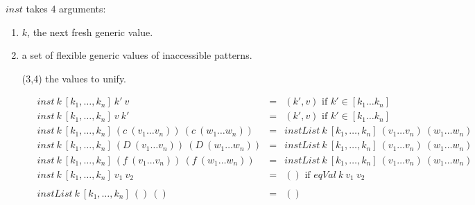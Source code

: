 \documentclass[acmsmall]{acmart}
\begin{document}
$inst$ takes 4 arguments:

\begin{enumerate}
  \item $k$, the next fresh generic value.
  \item a set of flexible generic values of inaccessible patterns.
  \item [(3,4)] the values to unify.
\end{enumerate}

\begin{figure}[H]
  \begin{equation*}
    \begin{aligned}
      inst \: k \: [k_1,\dots,k_n] \: k' \: v                                            & =              & (k', v) \textrm{ if } k' \in [k_1 \dots k_n]                                                                                                                      \\
      inst \: k \: [k_1,\dots,k_n] \: v \: k'                                            & =              & (k', v) \textrm{ if } k' \in [k_1 \dots k_n]                                                                                                                      \\
      inst \: k \: [k_1,\dots,k_n] \: (c \: (v_1 \dots v_n)) \: (c \: (w_1 \dots w_n))   & =              & instList \: k \: [k_1,\dots,k_n] \: (v_1 \dots v_n) \: (w_1 \dots w_n)                                                                                            \\
      inst \: k \: [k_1,\dots,k_n] \: (D \: (v_1 \dots v_n)) \: (D \: (w_1 \dots w_n))   & =              & instList \: k \: [k_1,\dots,k_n] \: (v_1 \dots v_n) \: (w_1 \dots w_n)                                                                                            \\
      inst \: k \: [k_1,\dots,k_n] \: (f \: (v_1 \dots v_n)) \: (f \: (w_1 \dots w_n))   & =              & instList \: k \: [k_1,\dots,k_n] \: (v_1 \dots v_n) \: (w_1 \dots w_n)                                                                                            \\
      inst \: k \: [k_1,\dots,k_n] \: v_1 \: v_2                                         & =              & () \textrm{ if } eqVal \: k \: v_1 \: v_2                                                                                                                         \\
      \\
      instList \: k \: [k_1,\dots,k_n] \: () \: ()                                       & =              & ()                                                                                                                                                                \\

\end{aligned}
\end{equation*}
\end{figure}
\end{document}
